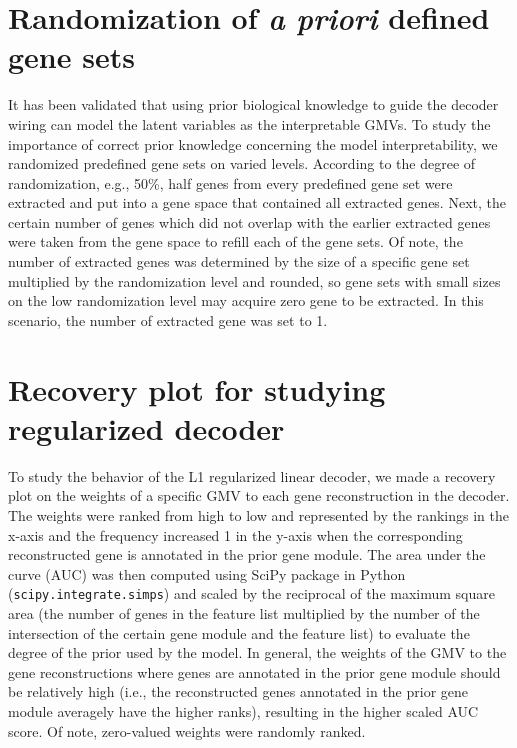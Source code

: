 \section{Randomization of \textit{a priori} defined gene sets}\label{methods:randomization}
It has been validated that using prior biological knowledge to guide the decoder wiring can model the latent variables as the interpretable GMVs\cite{Seninge2021,Rybakov2020,Lotfollahi2022}. To study the importance of correct prior knowledge concerning the model interpretability, we randomized predefined gene sets on varied levels. According to the degree of randomization, e.g., 50\%, half genes from every predefined gene set were extracted and put into a gene space that contained all extracted genes. Next, the certain number of genes which did not overlap with the earlier extracted genes were taken from the gene space to refill each of the gene sets. Of note, the number of extracted genes was determined by the size of a specific gene set multiplied by the randomization level and rounded, so gene sets with small sizes on the low randomization level may acquire zero gene to be extracted. In this scenario, the number of extracted gene was set to 1.

\section{Recovery plot for studying regularized decoder}\label{methods:recovery}
To study the behavior of the L1 regularized linear decoder, we made a recovery plot\cite{Quintero2020} on the weights of a specific GMV to each gene reconstruction in the decoder. The weights were ranked from high to low and represented by the rankings in the x-axis and the frequency increased 1 in the y-axis when the corresponding reconstructed gene is annotated in the prior gene module. The area under the curve (AUC) was then computed using SciPy package\cite{Virtanen2020} in Python (\texttt{scipy.integrate.simps}) and scaled by the reciprocal of the maximum square area (the number of genes in the feature list multiplied by the number of the intersection of the certain gene module and the feature list) to evaluate the degree of the prior used by the model. In general, the weights of the GMV to the gene reconstructions where genes are annotated in the prior gene module should be relatively high (i.e., the reconstructed genes annotated in the prior gene module averagely have the higher ranks), resulting in the higher scaled AUC score. Of note, zero-valued weights were randomly ranked.

